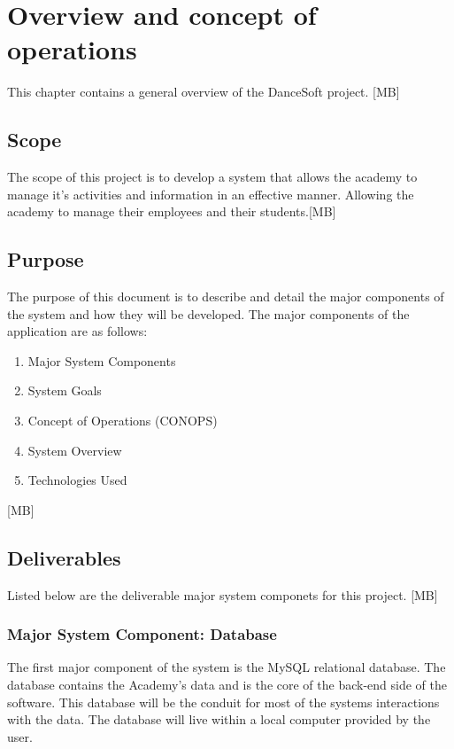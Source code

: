 
\chapter{Overview and concept of operations}

This chapter contains a  general overview of the DanceSoft project. [MB]


\section{Scope}
The scope of this project is to develop a system that allows the academy to manage it's activities and information in an effective manner. Allowing the academy to manage their employees and their students.[MB] 


\section{Purpose}
The purpose of this document is to describe and detail the major components of the system and how
they will be developed. The major components of the application are as follows:

\begin{enumerate}
\item Major System Components
\item System Goals
\item Concept of Operations (CONOPS)
\item System Overview
\item Technologies Used
\end{enumerate} [MB]

\section{Deliverables} 
Listed below are the deliverable major system componets for this project. [MB]

\subsection{Major System Component: Database}
The first major component of the system is the MySQL relational database. The database contains the Academy's data and is the core of the back-end side of the software. This database will be the conduit for most of the systems interactions with the data. The database will live within a local computer provided by the user.  

